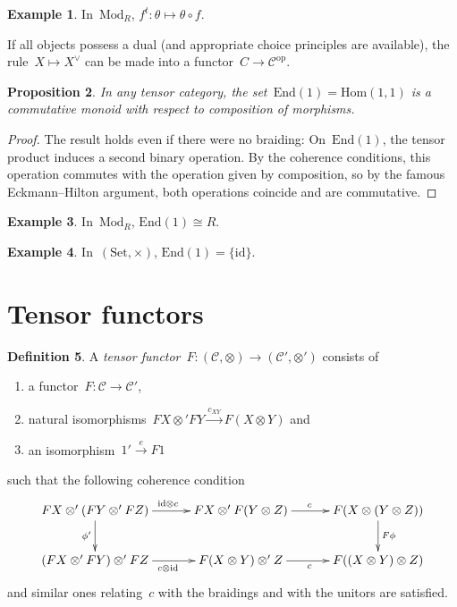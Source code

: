 \documentclass[a4paper,english,12pt]{scrartcl}
\theoremstyle{definition}
\newtheorem{defn}{Definition}[section]
\newtheorem{ex}[defn]{Example}
\theoremstyle{plain}
\newtheorem{prop}[defn]{Proposition}
\theoremstyle{remark}
\newcommand{\C}{\mathcal{C}}
\newcommand{\id}{\mathrm{id}}
\newcommand{\op}{\mathrm{op}}
\newcommand{\xra}[1]{\xrightarrow{#1}}
\renewcommand{\_}{\mathpunct{.}\,}
\newcommand{\?}{\,{:}\,}
\newcommand{\Mod}{\mathrm{Mod}}
\newcommand{\Set}{\mathrm{Set}}
\renewcommand{\hom}{\mathrm{Hom}}
\newcommand{\End}{\mathrm{End}}
\begin{document}
\begin{ex}In~$\Mod_R$, $f^t : \theta \mapsto \theta \circ f$.\end{ex}

If all objects possess a dual (and appropriate choice principles are
available), the rule~$X \mapsto X^\vee$ can be made into a
functor~$C \to \C^\op$.

\begin{prop}In any tensor category, the set~$\End(1) = \hom(1,1)$ is a
commutative monoid with respect to composition of morphisms.\end{prop}
\begin{proof}The result holds even if there were no braiding:
On~$\End(1)$, the tensor product induces a second binary operation. By the
coherence conditions, this operation commutes with the operation given by
composition, so by the famous Eckmann--Hilton argument, both operations coincide
and are commutative.\end{proof}

\begin{ex}In~$\Mod_R$, $\End(1) \cong R$.\end{ex}

\begin{ex}In~$(\Set,\times)$, $\End(1) = \{\id\}$.\end{ex}


\section{Tensor functors}

\begin{defn}A \emph{tensor functor}~$F : (\C,\otimes) \to (\C',\otimes')$
consists of
\begin{enumerate}
\item a functor~$F : \C \to \C'$,
\item natural isomorphisms~$FX \otimes' FY \xra{c_{XY}} F(X \otimes Y)$ and
\item an isomorphism~$1' \xra{e} F1$
\end{enumerate}
such that the following coherence condition
\[ \xymatrixcolsep{2.5pc}\xymatrix{
  FX \otimes' (FY \otimes' FZ) \ar[r]^{\id \otimes c} \ar[d]_{\phi'} &
  FX \otimes' F(Y \otimes Z) \ar[r]^c & F(X \otimes (Y \otimes Z)) \ar[d]^{F\phi} \\
  (FX \otimes' FY) \otimes' FZ \ar[r]_{c \otimes \id} &
  F(X \otimes Y) \otimes' Z \ar[r]_c &
  F((X \otimes Y) \otimes Z)
} \]
and similar ones relating~$c$ with the braidings and with the unitors are
satisfied.
\end{defn}
\end{document}
